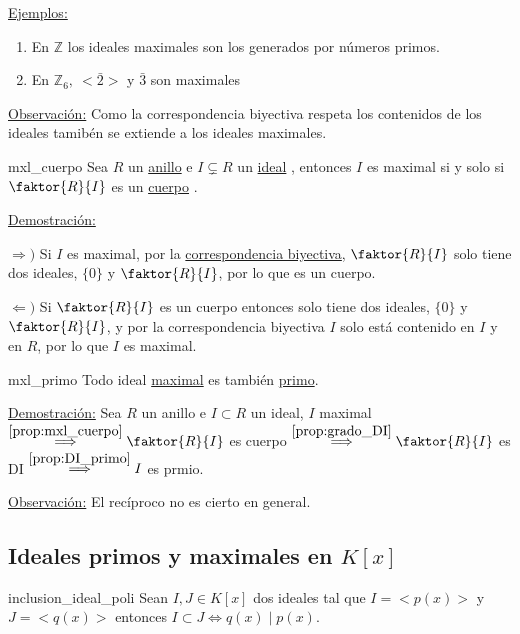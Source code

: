 \documentclass[10pt, a4paper]{article}
\newcommand{\Z}{\mathbb{Z}}
\newcommand{\obs}{\underline{Observación:} }
\newcommand{\ejs}{\underline{Ejemplos:} }
\newcommand{\demo}{\underline{Demostración:} }
\newcommand{\anillo}[1][]{\hyperref[def:anillo]{anillo}#1 }
\newcommand{\cuerpo}[1][]{\hyperref[def:cuerpo]{cuerpo}#1 }
\newcommand{\ideal}[1][]{\hyperref[def:ideal]{ideal}#1 }
\newenvironment{enumeratea}{\begin{enumerate}[label=\arabic*)]}
{\end{enumerate}}
\begin{document}
\ejs
\begin{enumeratea}
	\item En $\Z$ los ideales maximales son los generados por números primos.
	\item En $\Z_6,\ <\bar{2}>$ y $\bar{3}$ son maximales
\end{enumeratea}

\obs Como la correspondencia biyectiva respeta los contenidos de los ideales tamibén se extiende a los ideales maximales.

\begin{proposition}{}{mxl_cuerpo}
Sea $R$ un \anillo e $I \subsetneq R$ un \ideal, entonces $I$ es maximal si y solo si $\faktor{R}{I}$ es un \cuerpo.
\end{proposition}

\demo 

$\Longrightarrow )$ Si $I$ es maximal, por la \hyperref[theo:corr_biy]{correspondencia biyectiva}, $\faktor{R}{I}$ solo tiene dos ideales, $\{0\}$ y $ \faktor{R}{I}$, por lo que es un cuerpo. 

$\Longleftarrow )$ Si $\faktor{R}{I}$ es un cuerpo entonces solo tiene dos ideales, $\{0\}$ y $\faktor{R}{I}$, y por la correspondencia biyectiva $I$ solo está contenido en $I$ y en $R$, por lo que $I$ es maximal.

\begin{corolary}{}{mxl_primo}
Todo ideal \hyperref[def:ideal_maximal]{maximal} es también \hyperref[def:ideal_primo]{primo}.
\end{corolary}

\demo Sea $R$ un anillo e $I \subset R$ un ideal, $I$ maximal $\overset{\ref{prop:mxl_cuerpo}}{\implies} \faktor{R}{I}$ es cuerpo $\overset{\ref{prop:grado_DI}}{\implies} \faktor{R}{I}$ es DI $\overset{\ref{prop:DI_primo}}{\implies} I$ es prmio.

\vspace{3mm}

\obs El recíproco no es cierto en general.

\vspace{3mm}

\subsection{Ideales primos y maximales en \texorpdfstring{$K[x]$}{TEXT}}

\vspace{3mm}

\begin{proposition}{}{inclusion_ideal_poli}
Sean $I, J \in K[x]$ dos ideales tal que $I = <p(x)>$ y $J = <q(x)>$ entonces $I \subset J \iff q(x) \mid p(x)$.
\end{proposition}
\end{document}
